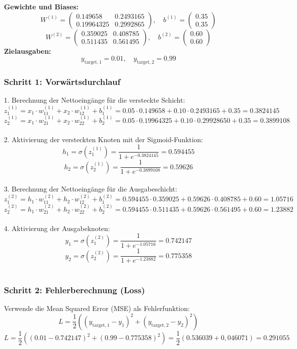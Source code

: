\documentclass{article}
\begin{document}
\textbf{Gewichte und Biases:}
\[
W^{(1)} = \begin{pmatrix}  0.149658 & 0.2493165 \\ 0.19964325 & 0.2992865 \end{pmatrix}, \quad
b^{(1)} = \begin{pmatrix} 0.35 \\ 0.35 \end{pmatrix}
\]
\[
W^{(2)} = \begin{pmatrix} 0.359025 & 0.408785 \\ 0.511435 & 0.561495 \end{pmatrix}, \quad
b^{(2)} = \begin{pmatrix} 0.60 \\ 0.60 \end{pmatrix}
\]
%
\textbf{Zielausgaben:}
\[
y_{\text{target}, 1} = 0.01, \quad y_{\text{target}, 2} = 0.99
\]

\subsubsection*{Schritt 1: Vorwärtsdurchlauf}

1. Berechnung der Nettoeingänge für die versteckte Schicht:\\
\[
z^{(1)}_1 = x_1 \cdot w^{(1)}_{11} + x_2 \cdot w^{(1)}_{12} + b^{(1)}_1 = 0.05 \cdot 0.149658 + 0.10 \cdot 0.2493165 + 0.35 = 0.3824145
\]
\[
z^{(1)}_2 = x_1 \cdot w^{(1)}_{21} + x_2 \cdot w^{(1)}_{22} + b^{(1)}_2 = 0.05 \cdot 0.19964325 + 0.10 \cdot 0.29928650 + 0.35 = 0.3899108
\]
\\
%
2. Aktivierung der versteckten Knoten mit der Sigmoid-Funktion:
\[
h_1 = \sigma(z^{(1)}_1) = \frac{1}{1 + e^{-0.3824145}} = 0.594455
\]
\[
h_2 = \sigma(z^{(1)}_2) = \frac{1}{1 + e^{-0.3899108}} = 0.59626
\] \\
%
3. Berechnung der Nettoeingänge für die Ausgabeschicht:
\[
z^{(2)}_1 = h_1 \cdot w^{(2)}_{11} + h_2 \cdot w^{(2)}_{12} + b^{(2)}_1 = 0.594455 \cdot 0.359025 + 0.59626 \cdot 0.408785 + 0.60 = 1.05716
\]
\[
z^{(2)}_2 = h_1 \cdot w^{(2)}_{21} + h_2 \cdot w^{(2)}_{22} + b^{(2)}_2 = 0.594455 \cdot 0.511435 + 0.59626 \cdot 0.561495 + 0.60 = 1.23882
\]\\
%
4. Aktivierung der Ausgabeknoten:
\[
y_1 = \sigma(z^{(2)}_1) = \frac{1}{1 + e^{-1.05716}} = 0.742147
\]
\[
y_2 = \sigma(z^{(2)}_2) = \frac{1}{1 + e^{-1.23882}} = 0.775358
\]
\\
\subsubsection*{Schritt 2: Fehlerberechnung (Loss)}
Verwende die Mean Squared Error (MSE) als Fehlerfunktion:
\[
L = \frac{1}{2} \left( (y_{\text{target},1} - y_1)^2 + (y_{\text{target},2} - y_2)^2 \right)
\]
\[
L = \frac{1}{2} \left( (0.01 - 0.742147)^2 + (0.99 - 0.775358)^2 \right) = \frac{1}{2} \left( 0.536039 +  0,046071 \right) = 0.291055
\]
\end{document}
